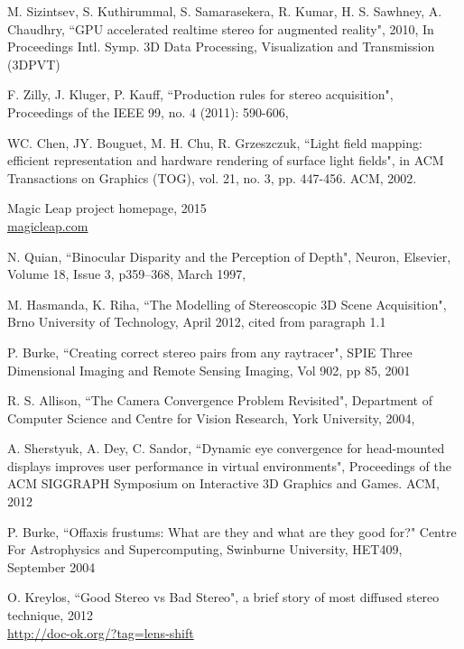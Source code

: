 \begin{thebibliography}{99}
M. Sizintsev, S. Kuthirummal, S. Samarasekera, R. Kumar, H. S. Sawhney, A. Chaudhry,
``GPU accelerated realtime stereo for augmented reality", 2010, In Proceedings Intl. Symp. 3D Data Processing, Visualization and Transmission (3DPVT)

F. Zilly, J. Kluger, P. Kauff,
``Production rules for stereo acquisition", Proceedings of the IEEE 99, no. 4 (2011): 590-606,

WC. Chen, JY. Bouguet, M. H. Chu, R. Grzeszczuk,
``Light field mapping: efficient representation and hardware rendering of surface light fields", in ACM Transactions on Graphics (TOG), vol. 21, no. 3, pp. 447-456. ACM, 2002.

Magic Leap project homepage, 2015 \\ \href{http://www.magicleap.com/}{magicleap.com}

N. Quian,
``Binocular Disparity and the Perception of Depth",
Neuron, Elsevier, Volume 18, Issue 3, p359–368, March 1997,



M. Hasmanda, K. Riha,
``The Modelling of Stereoscopic 3D Scene Acquisition",
Brno University of Technology, April 2012, cited from paragraph 1.1

P. Burke,
``Creating correct stereo pairs from any raytracer",
SPIE Three Dimensional Imaging and Remote Sensing Imaging, Vol 902, pp 85, 2001

R. S. Allison,
``The Camera Convergence Problem Revisited",
Department of Computer Science and Centre for Vision Research, York
University, 2004,

A. Sherstyuk, A. Dey, C. Sandor,
``Dynamic eye convergence for head-mounted displays improves user performance in virtual environments",
Proceedings of the ACM SIGGRAPH Symposium on Interactive 3D Graphics and Games. ACM, 2012


P. Burke,
``Offaxis frustums: What are they and what are they good for?"
Centre For Astrophysics and Supercomputing, Swinburne University, HET409, September 2004

O. Kreylos,
``Good Stereo vs Bad Stereo", a brief story of most diffused stereo technique, 2012 \\ \href{http://doc-ok.org/?tag=lens-shift}{http://doc-ok.org/?tag=lens-shift}


\end{thebibliography}

